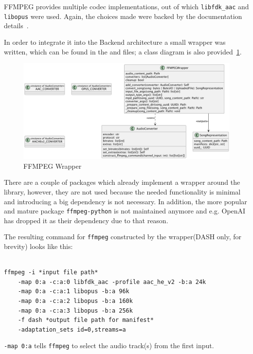 FFMPEG provides multiple codec implementations, out of which \texttt{libfdk\_aac} and \texttt{libopus} were used.
Again, the choices made were backed by the documentation details~\cite{libfdkaac,libopus}.

In order to integrate it into the Backend architecture a small wrapper was written, which can be found in the
 and  files; a class diagram is also
provided~\ref{fig:ffmpeg}.

\begin{figure}[htbp]
    \centering
    \includegraphics[width=1\textwidth, keepaspectratio]{diagrams/ffmpeg.png}
    \caption{FFMPEG Wrapper}
    \label{fig:ffmpeg}
\end{figure}

There are a couple of packages which already implement a wrapper around the library, however,
they are not used because the needed functionality is minimal and introducing a big
dependency is not necessary. In addition, the more popular and mature package \texttt{ffmpeg-python}\cite{ffmpegpython}
is not maintained anymore and e.g. OpenAI has dropped it as their dependency due to that reason\cite{ffmpegopenai}.

The resulting command for \texttt{ffmpeg} constructed by the wrapper(DASH only, for brevity) looks like this:

\begin{verbatim}

ffmpeg -i *input file path*
    -map 0:a -c:a:0 libfdk_aac -profile aac_he_v2 -b:a 24k
    -map 0:a -c:a:1 libopus -b:a 96k
    -map 0:a -c:a:2 libopus -b:a 160k
    -map 0:a -c:a:3 libopus -b:a 256k
    -f dash *output file path for manifest*
    -adaptation_sets id=0,streams=a
\end{verbatim}

\texttt{-map 0:a} tells \texttt{ffmpeg} to select the audio track(s) from the first input.

